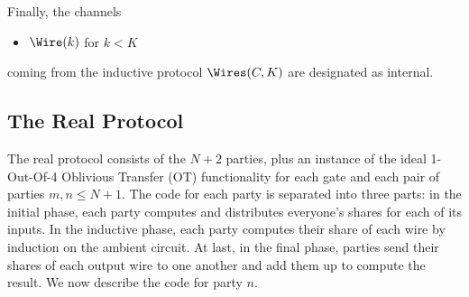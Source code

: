 \noindent Finally, the channels
\begin{itemize}
\item $\Wire(k)$ for $k < K$
\end{itemize}
coming from the inductive protocol $\Wires(C,K)$ are designated as internal.

\subsection{The Real Protocol}
The real protocol consists of the $N+2$ parties, plus an instance of the ideal 1-Out-Of-4 Oblivious Transfer (OT) functionality for each gate and each pair of parties $m,n \leq N+1$. The code for each party is separated into three parts: in the initial phase, each party computes and distributes everyone's shares for each of its inputs. In the inductive phase, each party computes their share of each wire by induction on the ambient circuit. At last, in the final phase, parties send their shares of each output wire to one another and add them up to compute the result. We now describe the code for party $n$.

